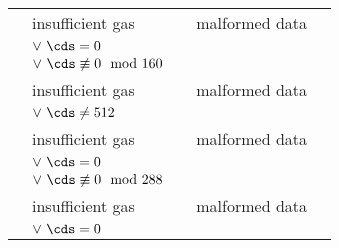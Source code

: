 \begin{figure}[!h]
\begin{tabular}{|l||l|c|l|c|}
		\instBlsGOneMsm{}                 & insufficient gas                               & \multirow{3}{*}{\toOob}   & malformed data                                                    &                                                  \\
                                                  & $\vee~\cds = 0$                                &                           &                                                                   &                                                  \\
                                                  & $\vee~\cds \not \equiv 0 \mod 160$             &                           &                                                                   &                                                  \\ \cline{1-4}
		\instBlsGTwoAdd{}                 & insufficient gas                               & \multirow{2}{*}{\toOob}   & malformed data                                                    &                                                  \\
                                                  & $\vee~\cds \neq 512$                           &                           &                                                                   &                                                  \\ \cline{1-4}
		\instBlsGTwoMsm{}                 & insufficient gas                               & \multirow{3}{*}{\toOob}   & malformed data                                                    &                                                  \\
                                                  & $\vee~\cds = 0$                                &                           &                                                                   &                                                  \\
                                                  & $\vee~\cds \not \equiv 0 \mod 288$             &                           &                                                                   &                                                  \\ \cline{1-4}
		\instBlsPairingCheck{}            & insufficient gas                               & \multirow{3}{*}{\toOob}   & malformed data                                                    &                                                  \\
                                                  & $\vee~\cds = 0$                                &                           &                                                                   &                                                  \\

\end{tabular}
\end{figure}
